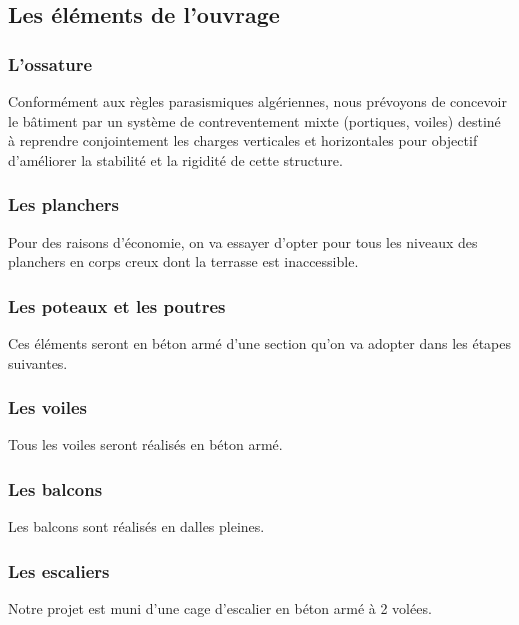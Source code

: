 \documentclass[12pt,a4paper]{report}
\numberwithin{equation}{section}
\begin{document}
	
	
	
	\subsection{Les éléments de l’ouvrage}
	
	\subsubsection{L’ossature}
	
	Conformément aux règles parasismiques algériennes, nous prévoyons de concevoir le bâtiment par un système de contreventement mixte (portiques, voiles) destiné à reprendre conjointement les charges verticales et horizontales pour objectif d’améliorer la stabilité et la rigidité de cette
	structure.
	
	\subsubsection{Les planchers}
	
	Pour des raisons d'économie, on va essayer d'opter pour tous les niveaux des planchers en corps creux dont la terrasse est inaccessible.
	
	\subsubsection{Les poteaux et les poutres}
	
	Ces éléments seront en béton armé d'une section qu'on va adopter dans les étapes suivantes.
	
	\subsubsection{Les voiles}
	
	Tous les voiles seront réalisés en béton armé.
	
	\subsubsection{Les balcons}
	
	Les balcons sont réalisés en dalles pleines.
	
	\subsubsection{Les escaliers}
	
	Notre projet est muni d’une cage d’escalier en béton armé à 2 volées.
	
\end{document}
